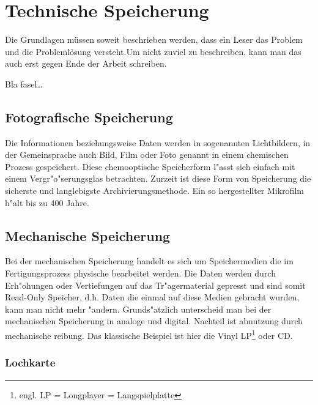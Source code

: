 
\chapter{Technische Speicherung}
\label{ch:Technische Speicherung}
Die Grundlagen müssen soweit beschrieben
werden, dass ein Leser das Problem und
die Problemlösung  versteht.Um nicht zuviel 
zu beschreiben, kann man das auch erst gegen 
Ende der Arbeit schreiben.

Bla fasel\ldots

    \section{Fotografische Speicherung}
    \label{ch:Technisch:sec:Fotografische Speicherung}
        
Die Informationen beziehungsweise Daten werden in sogenannten Lichtbildern, in der Gemeinsprache auch Bild, Film oder Foto genannt in einem chemischen Prozess gespeichert. Diese chemooptische Speicherform l"asst sich einfach mit einem Vergr"o"serungsglas betrachten. Zurzeit ist diese Form von Speicherung die sicherste und langlebigste Archivierungsmethode. Ein so hergestellter Mikrofilm h"alt bis zu 400 Jahre.
                
    \section{Mechanische Speicherung}
    \label{ch:Technisch:sec:Mechanische Speicherung}
    
    Bei der mechanischen Speicherung handelt es sich um Speichermedien die im Fertigungsprozess physische bearbeitet werden. Die Daten werden durch Erh"ohungen oder Vertiefungen auf das Tr"agermaterial gepresst und sind somit Read-Only Speicher, d.h. Daten die einmal auf diese Medien gebracht wurden, kann man nicht mehr "andern. Grunds"atzlich unterscheid man bei der mechanischen Speicherung in analoge und digital. Nachteil ist abnutzung durch mechanische reibung. Das klassische Beispiel ist hier die Vinyl LP\footnote[4]{engl. LP = Longplayer = Langspielplatte} oder CD. 
        \subsection{Lochkarte}
        \label{ch:Technisch:sec:Mechanische Speicherung:sub:Lochkarte}
            
